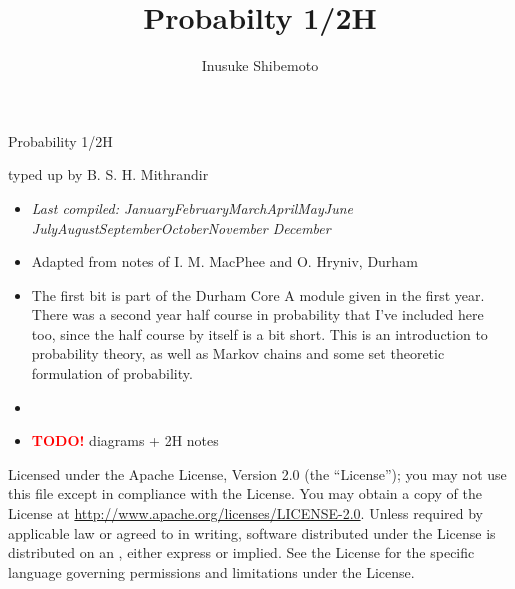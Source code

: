 \documentclass[letter-paper]{tufte-book}
\title{Probabilty 1/2H}
\author[]{Inusuke Shibemoto}
\newcommand{\monthyear}{%
  \ifcase\month\or January\or February\or March\or April\or May\or June\or
  July\or August\or September\or October\or November\or
  December\fi\space\number\year
}
\newcommand{\TODO}{\textcolor{red}{\bf TODO!}\xspace}
\begin{document}



\chapter*{}

\begin{fullwidth}

\par \begin{center}{\Huge Probability 1/2H}\end{center}

\vspace*{5mm}

\par \begin{center}{\Large typed up by B. S. H. Mithrandir}\end{center}

\vspace*{5mm}

\begin{itemize}
  \item \textit{Last compiled: \monthyear}
  \item Adapted from notes of I. M. MacPhee and O. Hryniv, Durham
  \item The first bit is part of the Durham Core A module given in the first year. There was a second year half course in probability that I've included here too, since the half course by itself is a bit short. This
  is an introduction to probability theory, as well as Markov chains and some
  set theoretic formulation of probability.
  \item[]
  \item \TODO diagrams + 2H notes
\end{itemize}

\par

\par Licensed under the Apache License, Version 2.0 (the ``License''); you may not
use this file except in compliance with the License. You may obtain a copy
of the License at \url{http://www.apache.org/licenses/LICENSE-2.0}. Unless
required by applicable law or agreed to in writing, software distributed
under the License is distributed on an , either express or implied. See the
License for the specific language governing permissions and limitations
under the License.
\end{fullwidth}
\end{document}
